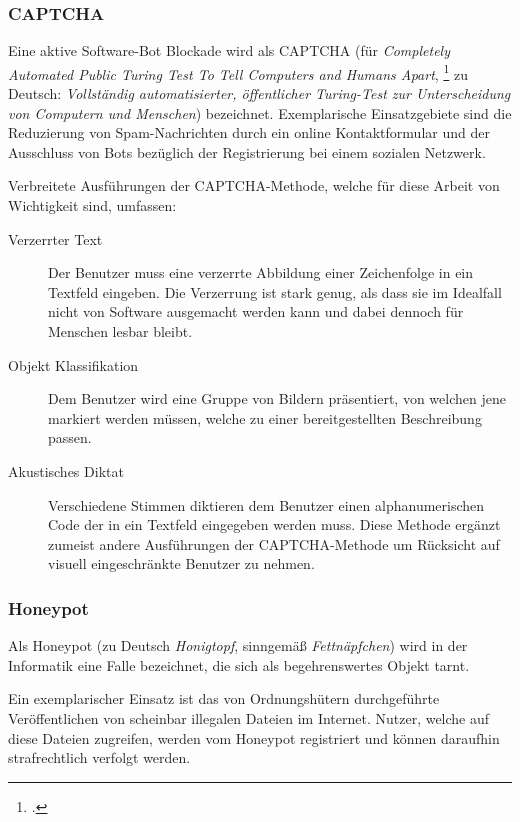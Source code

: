\subsubsection{CAPTCHA} %
\label{ssub:captcha}
Eine aktive Software-Bot Blockade wird als CAPTCHA (für \emph{Completely
Automated Public Turing Test To Tell Computers and Humans Apart},
\footcite{captchaNet} zu Deutsch: \emph{Vollständig automatisierter,
öffentlicher Turing-Test zur Unterscheidung von Computern und Menschen})
bezeichnet. Exemplarische Einsatzgebiete sind die Reduzierung von
Spam-Nachrichten durch ein online Kontaktformular und der Ausschluss von Bots
bezüglich der Registrierung bei einem sozialen Netzwerk.

Verbreitete Ausführungen der CAPTCHA-Methode, welche für diese Arbeit von
Wichtigkeit sind, umfassen:

\begin{description}
  \item[Verzerrter Text]
  Der Benutzer muss eine verzerrte Abbildung einer Zeichenfolge in ein Textfeld
  eingeben. Die Verzerrung ist stark genug, als dass sie im Idealfall nicht von
  Software ausgemacht werden kann und dabei dennoch für Menschen lesbar bleibt.
  
  \item[Objekt Klassifikation]
  Dem Benutzer wird eine Gruppe von Bildern präsentiert, von welchen jene
  markiert werden müssen, welche zu einer bereitgestellten Beschreibung passen.
  
  \item[Akustisches Diktat]
  Verschiedene Stimmen diktieren dem Benutzer einen alphanumerischen Code der
  in ein Textfeld eingegeben werden muss. Diese Methode ergänzt zumeist andere
  Ausführungen der CAPTCHA-Methode um Rücksicht auf visuell eingeschränkte
  Benutzer zu nehmen.
\end{description}

\subsubsection{Honeypot} %
\label{ssub:honeypot}
Als Honeypot (zu Deutsch \emph{Honigtopf}, sinngemäß \emph{Fettnäpfchen}) wird
in der Informatik eine Falle bezeichnet, die sich als begehrenswertes Objekt
tarnt.

Ein exemplarischer Einsatz ist das von Ordnungshütern durchgeführte
Veröffentlichen von scheinbar illegalen Dateien im Internet. Nutzer, welche auf
diese Dateien zugreifen, werden vom Honeypot registriert und können daraufhin
strafrechtlich verfolgt werden.

